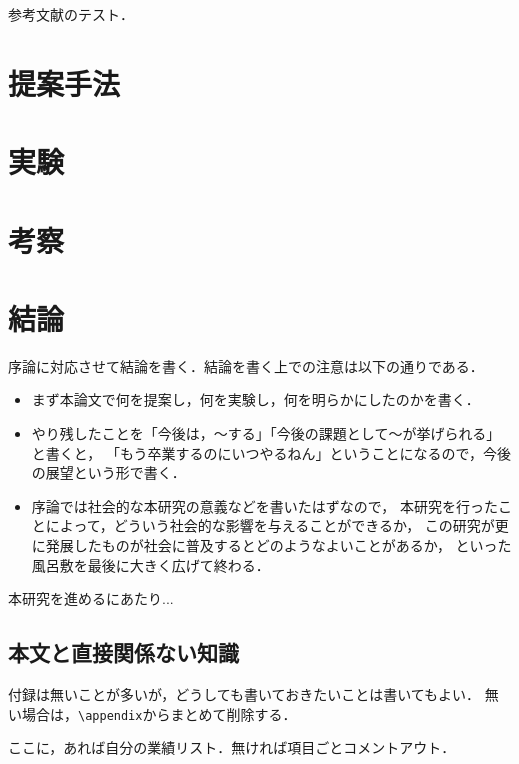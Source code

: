 \documentclass[book,paper=a4,fontsize=10pt,jafontscale=0.92]{jlreq}
\begin{document}
参考文献\cite{Kameyama92,Favalora02,Tachi15}のテスト．

\chapter{提案手法}

\chapter{実験}

\chapter{考察}

\chapter{結論}

序論に対応させて結論を書く．結論を書く上での注意は以下の通りである．
\begin{itemize}
 \item まず本論文で何を提案し，何を実験し，何を明らかにしたのかを書く．
 \item やり残したことを「今後は，〜する」「今後の課題として〜が挙げられる」と書くと，
       「もう卒業するのにいつやるねん」ということになるので，今後の展望という形で書く．
 \item 序論では社会的な本研究の意義などを書いたはずなので，
       本研究を行ったことによって，どういう社会的な影響を与えることができるか，
       この研究が更に発展したものが社会に普及するとどのようなよいことがあるか，
       といった風呂敷を最後に大きく広げて終わる．
\end{itemize}


\acknowledgements

本研究を進めるにあたり...






\appendix

\section{本文と直接関係ない知識}

付録は無いことが多いが，どうしても書いておきたいことは書いてもよい．
無い場合は，\verb|\appendix|からまとめて削除する．


\papers %

ここに，あれば自分の業績リスト．無ければ項目ごとコメントアウト．
\end{document}
